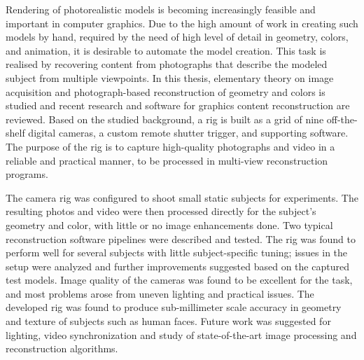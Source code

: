 \begin{abstractpage}[english]
Rendering of photorealistic models is becoming increasingly feasible and important in computer graphics.
Due to the high amount of work in creating such models by hand, required by the need of high level of detail in geometry, colors, and animation, it is desirable to automate the model creation.
This task is realised by recovering content from photographs that describe the modeled subject from multiple viewpoints.
In this thesis, elementary theory on image acquisition and photograph-based reconstruction of geometry and colors is studied and recent research and software for graphics content reconstruction are reviewed.
Based on the studied background, a rig is built as a grid of nine off-the-shelf digital cameras, a custom remote shutter trigger, and supporting software.
The purpose of the rig is to capture high-quality photographs and video in a reliable and practical manner, to be processed in multi-view reconstruction programs.

The camera rig was configured to shoot small static subjects for experiments.
The resulting photos and video were then processed directly for the subject's geometry and color, with little or no image enhancements done.
Two typical reconstruction software pipelines were described and tested.
The rig was found to perform well for several subjects with little subject-specific tuning;
issues in the setup were analyzed and further improvements suggested based on the captured test models.
Image quality of the cameras was found to be excellent for the task, and most problems arose from uneven lighting and practical issues.
The developed rig was found to produce sub-millimeter scale accuracy in geometry and texture of subjects such as human faces.
Future work was suggested for lighting, video synchronization and study of state-of-the-art image processing and reconstruction algorithms.
\end{abstractpage}

\newpage

